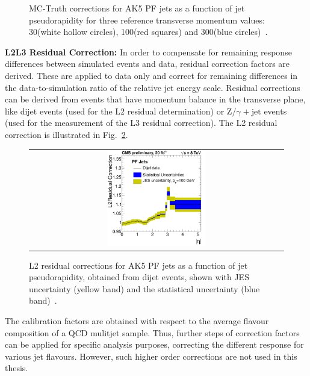 \begin{description}
\begin{figure}[!h]
\begin{tabular}{c}
  \end{tabular}
  \caption{MC-Truth corrections for AK5 PF jets as a function of jet pseudorapidity for three reference transverse momentum values: 30\gev (white hollow circles), 100\gev (red squares) and 300\gev (blue circles)~\cite{CMS-DP-2013-033}.}
  \label{fig:l2l3}
\end{figure}
 \item \textbf{L2L3 Residual Correction:} In order to compensate for remaining response differences between simulated events and data, residual correction factors are derived. These are applied to data only and correct for remaining differences in the data-to-simulation ratio of the relative jet energy scale. Residual corrections can be derived from events that have momentum balance in the transverse plane, like dijet events (used for the L2 residual determination) or $\mathrm{Z/\gamma+jet}$ events (used for the measurement of the L3 residual correction). The L2 residual correction is illustrated in Fig.~\ref{fig:l2res}.
\begin{figure}[!h]
  \centering 
  \begin{tabular}{c}
    \includegraphics[width=0.4\textwidth]{figures/ResComp_FSRcorr_residuals_Abseta_PF_DiJetData.pdf} 
  \end{tabular}
  \caption{L2 residual corrections for AK5 PF jets as a function of jet pseudorapidity, obtained from dijet events, shown with JES uncertainty (yellow band) and the statistical uncertainty (blue band)~\cite{CMS-DP-2013-033}.}
  \label{fig:l2res}
\end{figure}

\end{description}
The calibration factors are obtained with respect to the average flavour composition of a QCD mulitjet sample. Thus, further steps of correction factors can be applied for specific analysis purposes, \eg correcting the different response for various jet flavours. However, such higher order corrections are not used in this thesis.  

